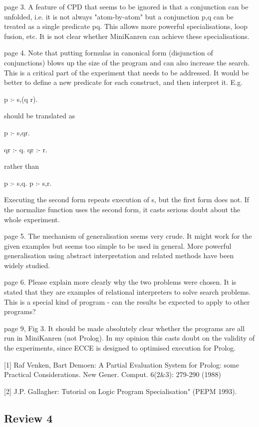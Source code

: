 page 3. A feature of CPD that seems to be ignored is that a conjunction can be unfolded, i.e. it is not always "atom-by-atom" but a conjunction p,q can be treated as a single predicate pq.  This allows more powerful specialisations, loop fusion, etc.  It is not clear whether MiniKanren can achieve these specialisations.


page 4.  Note that putting formulas in canonical form (disjunction of conjunctions) blows up the size of the program and can also increase the search.  This is a critical part of the experiment that needs to be addressed.  It would be better to define a new predicate for each construct, and then interpret it.  E.g.

p :- s,(q \/ r).

should be translated as

p :- s,qr.

qr :- q.
qr :- r.

rather than

p :- s,q.
p :- s,r.

Executing the second form repeats execution of s, but the first form does not.  If the normalize function uses the second form, it casts serious doubt about the whole experiment.

page 5.  The mechanism of generalisation seems very crude.  It might work for the given examples but seems too simple to be used in general.  More powerful generalisation using abstract interpretation and related methods have been widely studied.

page 6.  Please explain more clearly why the two problems were chosen. It is stated that they are examples of relational interpreters to solve search problems. This is a special kind of program - can the results be expected to apply to other programs?

page 9, Fig 3.  It should be made absolutely clear whether the programs are all run in MiniKanren (not Prolog). In my opinion this casts doubt on the validity of the experiments, since ECCE is designed to optimised execution for Prolog.


[1] Raf Venken, Bart Demoen:
A Partial Evaluation System for Prolog: some Practical Considerations. New Gener. Comput. 6(2\&3): 279-290 (1988)

[2] J.P. Gallagher: Tutorial on Logic Program Specialisation"  (PEPM 1993).

\subsection*{Review 4}


